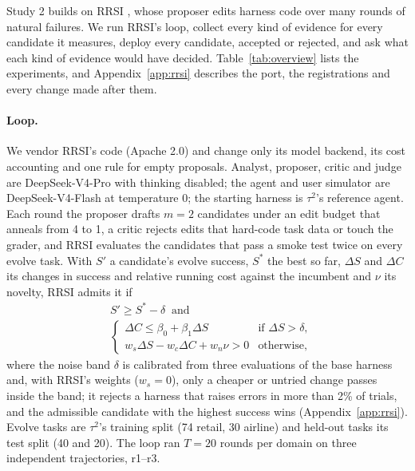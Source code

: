 \documentclass[11pt]{article}
\begin{document}
Study 2 builds on RRSI \citep{rrsi2026}, whose proposer edits harness code over many rounds of natural failures. We run RRSI's loop, collect every kind of evidence for every candidate it measures, deploy every candidate, accepted or rejected, and ask what each kind of evidence would have decided. Table~\ref{tab:overview} lists the experiments, and Appendix~\ref{app:rrsi} describes the port, the registrations and every change made after them.

\paragraph{Loop.} We vendor RRSI's code (Apache 2.0) and change only its model backend, its cost accounting and one rule for empty proposals. Analyst, proposer, critic and judge are DeepSeek-V4-Pro with thinking disabled; the agent and user simulator are DeepSeek-V4-Flash at temperature 0; the starting harness is $\tau^2$'s reference agent. Each round the proposer drafts $m=2$ candidates under an edit budget that anneals from 4 to 1, a critic rejects edits that hard-code task data or touch the grader, and RRSI evaluates the candidates that pass a smoke test twice on every evolve task. With $S'$ a candidate's evolve success, $S^*$ the best so far, $\Delta S$ and $\Delta C$ its changes in success and relative running cost against the incumbent and $\nu$ its novelty, RRSI admits it if
\begin{equation}
\begin{aligned}
&S'\ge S^*-\delta\ \text{ and}\\
&\begin{cases}\Delta C\le\beta_0+\beta_1\Delta S & \text{if }\Delta S>\delta,\\ w_s\Delta S-w_c\Delta C+w_n\nu>0 & \text{otherwise,}\end{cases}
\end{aligned}
\label{eq:admit}
\end{equation}
where the noise band $\delta$ is calibrated from three evaluations of the base harness and, with RRSI's weights ($w_s=0$), only a cheaper or untried change passes inside the band; it rejects a harness that raises errors in more than 2\% of trials, and the admissible candidate with the highest success wins (Appendix~\ref{app:rrsi}). Evolve tasks are $\tau^2$'s training split (74 retail, 30 airline) and held-out tasks its test split (40 and 20). The loop ran $T=20$ rounds per domain on three independent trajectories, r1--r3.
\end{document}
